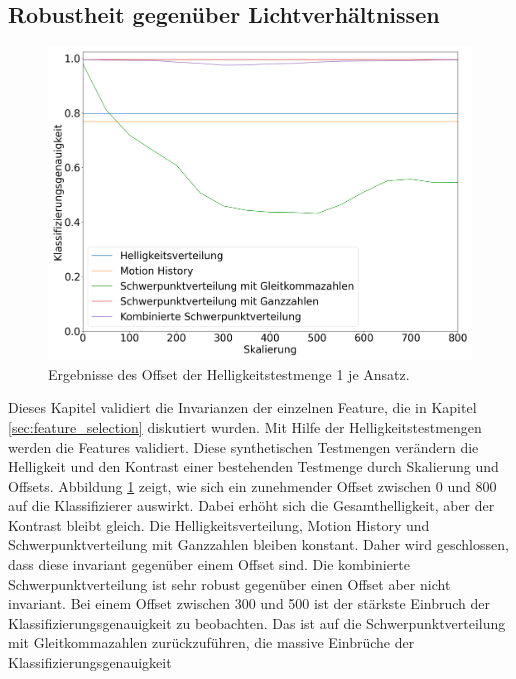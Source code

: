 \subsection{Robustheit gegenüber Lichtverhältnissen}
\label{sec:brightness_eval}
\begin{figure}[h!]
    \centering
    \includegraphics[width=\linewidth]{images/brightness_offset.png}
    \caption{Ergebnisse des Offset der Helligkeitstestmenge 1 je Ansatz.}
    \label{fig:brightness_offset}
\end{figure}
Dieses Kapitel validiert die Invarianzen der einzelnen Feature, die in Kapitel \ref{sec:feature_selection} diskutiert wurden. Mit Hilfe der Helligkeitstestmengen werden die Features validiert. Diese synthetischen Testmengen
verändern die Helligkeit und den Kontrast einer bestehenden Testmenge durch Skalierung und Offsets.
\newline
\newline
Abbildung \ref{fig:brightness_offset} zeigt, wie sich ein zunehmender Offset zwischen 0 und 800 auf die Klassifizierer auswirkt. Dabei erhöht sich die Gesamthelligkeit, aber der Kontrast bleibt gleich.
Die Helligkeitsverteilung, Motion History und Schwerpunktverteilung mit Ganzzahlen bleiben
konstant. Daher wird geschlossen, dass diese invariant gegenüber einem Offset sind. Die kombinierte Schwerpunktverteilung ist sehr robust gegenüber einen Offset aber nicht invariant. Bei einem Offset zwischen 300
und 500 ist der stärkste Einbruch der Klassifizierungsgenauigkeit zu beobachten. Das ist auf die Schwerpunktverteilung mit Gleitkommazahlen zurückzuführen, die massive Einbrüche der Klassifizierungsgenauigkeit
